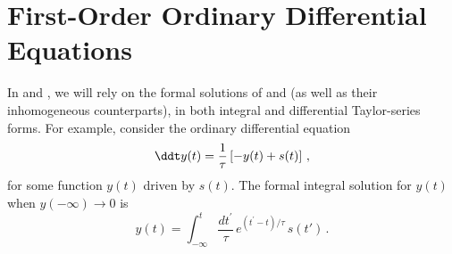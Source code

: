 %
%
%
%

 \section{First-Order Ordinary Differential Equations\label{sct:math_prelim_first_order_odes}}

In  and , we will rely on the formal solutions of  and  (as well as their inhomogeneous counterparts), in both integral and differential Taylor-series forms. For example, consider the ordinary differential equation
\begin{equation} \label{eqn:fodes_driven_example}
  \ddt y(t) = \frac{1}{\tau} \left[-y(t) + s(t)\right]\, ,
\end{equation}
for some function $y(t)$ driven by $s(t)$. The formal integral solution for $y(t)$ when $y(-\infty) \longrightarrow 0$ is
\begin{equation} \label{eqn:fodes_driven_example_soln_int}
  y(t) = \int_{-\infty}^{t} \frac{d t^\prime}{\tau}\, e^{\left(t^\prime - t\right)/\tau}\, s\left(t'\right)\, .
\end{equation}

